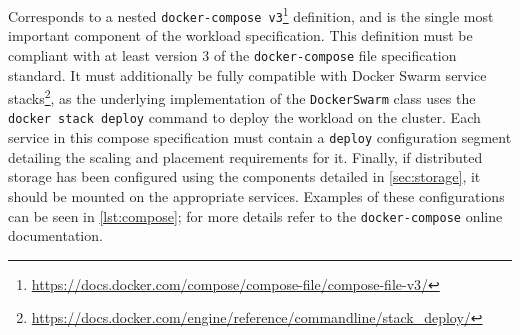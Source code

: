 \begin{description}
    Corresponds to a nested \texttt{docker-compose v3}\footnote{\url{https://docs.docker.com/compose/compose-file/compose-file-v3/}} definition, and is the single most important component of the workload specification.
    This definition must be compliant with at least version 3 of the \texttt{docker-compose} file specification standard.
    It must additionally be fully compatible with Docker Swarm service stacks\footnote{%
        \url{https://docs.docker.com/engine/reference/commandline/stack_deploy/}%
    }, as the underlying implementation of the \texttt{DockerSwarm} class uses the \texttt{docker stack deploy} command to deploy the workload on the cluster.
    Each service in this compose specification must contain a \texttt{deploy} configuration segment detailing the scaling and placement requirements for it.
    Finally, if distributed storage has been configured using the components detailed in \cref{sec:storage}, it should be mounted on the appropriate services.
    Examples of these configurations can be seen in \cref{lst:compose}; for more details refer to the \texttt{docker-compose} online documentation.
\end{description}